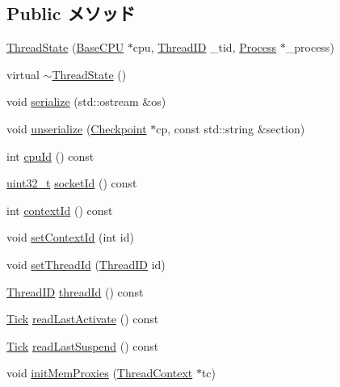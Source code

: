 \subsection*{Public メソッド}
\begin{DoxyCompactItemize}
\item 
\hyperlink{structThreadState_afc2e5271f3b004bc94ed9d151e3d55d0}{ThreadState} (\hyperlink{classBaseCPU}{BaseCPU} $\ast$cpu, \hyperlink{base_2types_8hh_ab39b1a4f9dad884694c7a74ed69e6a6b}{ThreadID} \_\-tid, \hyperlink{classProcess}{Process} $\ast$\_\-process)
\item 
virtual \hyperlink{structThreadState_aea639dd2849f4339b36b5e5a28a82613}{$\sim$ThreadState} ()
\item 
void \hyperlink{structThreadState_a53e036786d17361be4c7320d39c99b84}{serialize} (std::ostream \&os)
\item 
void \hyperlink{structThreadState_af22e5d6d660b97db37003ac61ac4ee49}{unserialize} (\hyperlink{classCheckpoint}{Checkpoint} $\ast$cp, const std::string \&section)
\item 
int \hyperlink{structThreadState_a1e2d18ebf4e21f2416c21a8b072e2c7b}{cpuId} () const 
\item 
\hyperlink{Type_8hh_a435d1572bf3f880d55459d9805097f62}{uint32\_\-t} \hyperlink{structThreadState_a1ff97b43199001357718671a4d922d12}{socketId} () const 
\item 
int \hyperlink{structThreadState_a651d5d14e7a4e95ebe6d7f5b8ee5a107}{contextId} () const 
\item 
void \hyperlink{structThreadState_a0dd10037a5b0eadaddfe7c67d52d3ac6}{setContextId} (int id)
\item 
void \hyperlink{structThreadState_ac0b004fcd497945d2cdd1a056f25a182}{setThreadId} (\hyperlink{base_2types_8hh_ab39b1a4f9dad884694c7a74ed69e6a6b}{ThreadID} id)
\item 
\hyperlink{base_2types_8hh_ab39b1a4f9dad884694c7a74ed69e6a6b}{ThreadID} \hyperlink{structThreadState_a1df6a20d1f58735daa08de45c9ea6a7a}{threadId} () const 
\item 
\hyperlink{base_2types_8hh_a5c8ed81b7d238c9083e1037ba6d61643}{Tick} \hyperlink{structThreadState_a78096bf01bfdffc7e26ebcfbffbd84f8}{readLastActivate} () const 
\item 
\hyperlink{base_2types_8hh_a5c8ed81b7d238c9083e1037ba6d61643}{Tick} \hyperlink{structThreadState_a7e2c7c6c7f94c03061a1916044e36880}{readLastSuspend} () const 
\item 
void \hyperlink{structThreadState_ab24719c7923d7d57030fa05bb166c62c}{initMemProxies} (\hyperlink{classThreadContext}{ThreadContext} $\ast$tc)

\end{DoxyCompactItemize}

